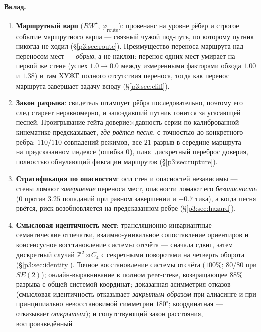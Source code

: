 \documentclass{article}
\newcommand{\rwstar}{RW^{\star}}
\newcommand{\phiroute}{\varphi_{\mathrm{route}}}
\begin{document}
\paragraph{Вклад.}
\begin{enumerate}[leftmargin=20pt,itemsep=2pt,topsep=2pt]
\item \textbf{Маршрутный варп} ($\rwstar$, $\phiroute$): провенанс на
  уровне рёбер и строгое событие маршрутного варпа --- связный чужой
  под-путь, по которому путник никогда не ходил (\S\ref{p3:sec:route}).
  Преимущество переноса маршрута над переносом мест --- \emph{обрыв},
  а не наклон: перенос одних мест умирает на первой же стене (успех
  $1.0 \to 0.0$ между измеренными факторами обхода $1.00$ и $1.38$) и
  там ХУЖЕ полного отсутствия переноса, тогда как перенос маршрута
  завершает задачу всюду (\S\ref{p3:sec:cliff}).
\item \textbf{Закон разрыва}: свидетель штампует рёбра последовательно,
  поэтому его след стареет неравномерно, и запоздавший путник гонится
  за угасающей песней. Проигрывание гейта доверие$\times$давность серии
  по калиброванной кинематике предсказывает, \emph{где рвётся песня},
  с точностью до конкретного ребра: $110/110$ совпадений режимов, все
  $21$ разрыв в середине маршрута --- на предсказанном индексе (ошибка
  $0$), плюс дискретный переброс доверия, полностью обнуляющий
  фиксации маршрутов (\S\ref{p3:sec:rupture}).
\item \textbf{Стратификация по опасностям}: оси стен и опасностей
  независимы --- стены ломают \emph{завершение} переноса мест,
  опасности ломают его \emph{безопасность} ($0$ против $3.25$
  попаданий при равном завершении и $+0.7$ тика), а когда песня
  рвётся, риск возобновляется на предсказанном ребре
  (\S\ref{p3:sec:hazard}).
\item \textbf{Смысловая идентичность мест}: трансляционно-инвариантные
  семантические отпечатки, взаимно-уникальное сопоставление ориентиров
  и консенсусное восстановление системы отсчёта --- сначала сдвиг,
  затем дискретный случай $\mathbb{Z}^2\rtimes C_4$ с секретными поворотами на четверть оборота
  (\S\ref{p3:sec:identity}). Точное восстановление системы отсчёта
  ($100\%$; $80/80$ при $SE(2)$); онлайн-выравнивание в полном
  peer-стеке, возвращающее $88\%$ разрыва с общей системой координат;
  доказанная асимметрия отказов (смысловая идентичность отказывает
  \emph{закрытым образом} при алиасинге и при принципиально
  невосстановимой симметрии $180^\circ$; координатная --- отказывает
  \emph{открытым}); и сопутствующий закон расстояния, воспроизведённый

\end{enumerate}
\end{document}
